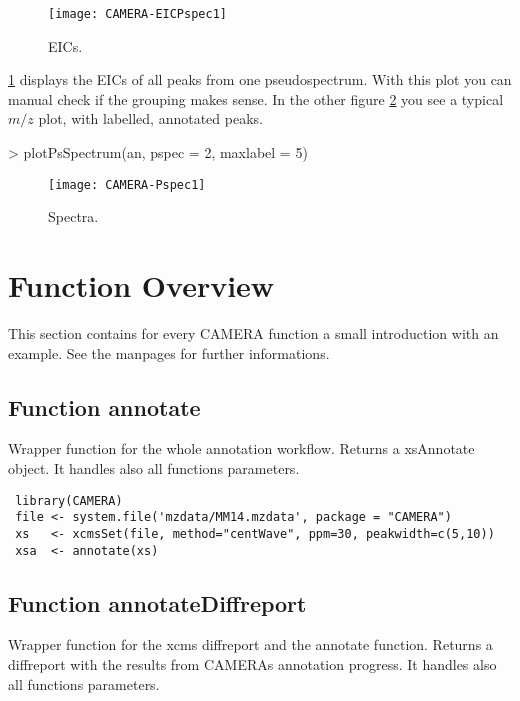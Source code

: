 \documentclass[a4paper,12pt]{article}
\begin{document}
\begin{figure}
\begin{center}
\texttt{[image: CAMERA-EICPspec1]}
\end{center}
\caption{\label{EICpspec1} EICs.}
\end{figure}
\ref{EICpspec1} displays the EICs of all peaks from one pseudospectrum.
With this plot you can manual check if the grouping makes sense. In the other
figure \ref{EICpspec2} you see a typical $m/z$ plot, with labelled, annotated
peaks.
\begin{Schunk}
\begin{Sinput}
> plotPsSpectrum(an, pspec = 2, maxlabel = 5)
\end{Sinput}
\end{Schunk}

\begin{figure}
\begin{center}
\texttt{[image: CAMERA-Pspec1]}
\end{center}
\caption{\label{EICpspec2} Spectra.}
\end{figure}

%

\section{Function Overview}
This section contains for every CAMERA function a small introduction with an
example. See the manpages for further informations.

\subsection{Function annotate}
\label{fct:annotate}
Wrapper function for the whole annotation workflow. Returns a
xsAnnotate object. It handles also all functions parameters.

\begin{verbatim}
 library(CAMERA)
 file <- system.file('mzdata/MM14.mzdata', package = "CAMERA")
 xs   <- xcmsSet(file, method="centWave", ppm=30, peakwidth=c(5,10))
 xsa  <- annotate(xs)
\end{verbatim}

\subsection{Function annotateDiffreport}
\label{fct:annotateDiffreport}
Wrapper function for the xcms diffreport and the annotate function. Returns a
diffreport with the results from CAMERAs annotation progress. It handles also
all functions parameters.
\end{document}
